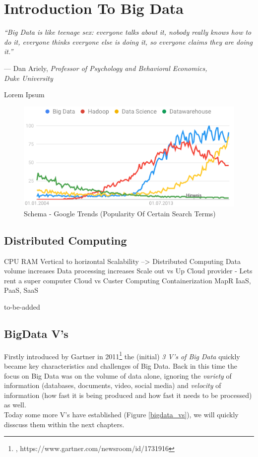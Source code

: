 \chapter{Introduction To Big Data}
\label{chapter_bigdata}
\setlength{\epigraphwidth}{0.95\textwidth}
\setlength\epigraphrule{0pt}
\epigraph{\itshape ``Big Data is like teenage sex: everyone talks about it, nobody really knows how to do it, everyone thinks everyone else is doing it, so everyone claims they are doing it.''}{--- Dan Ariely, \textit{Professor of Psychology and Behavioral Economics,\\ Duke University}}


Lorem Ipsum

\begin{figure}[ht]
	\centering
  \includegraphics[width=1.0\textwidth]{google_trends_bigdata.png}
	\caption{Schema - Google Trends (Popularity Of Certain Search Terms)}
	\label{google_trends_bigdata}
\end{figure}


\section{Distributed Computing}
\label{bd_hwe}

CPU RAM Vertical to horizontal Scalability --> Distributed Computing
Data volume increases
Data processing increases
Scale out vs Up
Cloud provider 
- Lets rent a super computer
Cloud vs Custer Computing
Containerization
MapR IaaS, PaaS, SaaS


to-be-added

\newpage
\section{BigData V's}
\label{bd_vs}
Firstly introduced by Gartner in 2011\footnote{\cite{GRTNRVS}, https://www.gartner.com/newsroom/id/1731916} the (initial) \textit{3 V's of Big Data} quickly became key characteristics and challenges of Big Data. Back in this time the focus on Big Data was on the volume of data alone, ignoring the \textit{variety} of information (databases, documents, video, social media) and \textit{velocity} of information (how fast it is being produced and how fast it needs to be processed) as well. \\
Today some more V's have established (Figure \ref{bigdata_vs}), we will quickly disscuss them within the next chapters.

